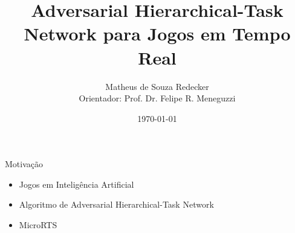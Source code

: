 \documentclass{beamer}
\title[\fontsize{0.08cm}{1em}\selectfont Adversarial Hierarchical-Task Network para Jogos]{Adversarial Hierarchical-Task Network para Jogos em Tempo Real}
\author[Matheus de Souza Redecker]{Matheus de Souza Redecker
\\{\footnotesize Orientador: Prof. Dr. Felipe R. Meneguzzi}
}
\institute[PUCRS]{Pontificia Universidade Catolia do Rio Grande do Sul
\medskip\\
\url{matheus.redecker@acad.pucrs.br}
}
\date{\today}
\begin{document}

    \begin{frame}
        \titlepage
    \end{frame}



\begin{frame}{Motivação}
	\begin{itemize}
	    \item Jogos em Inteligência Artificial
	    \item Algoritmo de Adversarial Hierarchical-Task Network
	    \item MicroRTS
    \end{itemize}
\end{frame}
\end{document}

